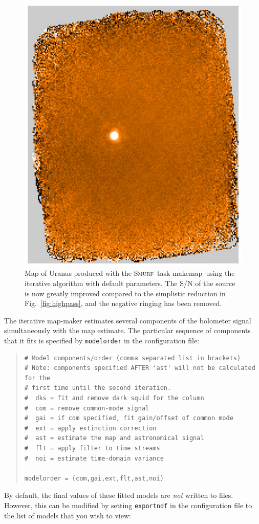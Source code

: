 \documentclass[twoside,11pt]{article}
\newenvironment{myquote}{\begin{quote}\begin{small}}{\end{small}\end{quote}}
\newcommand{\smurf}{\xref{\textsc{Smurf}}{sun258}{}}
\newcommand{\task}[1]{\textsf{#1}}
\newcommand{\makemap}{\xref{\task{makemap}}{sun258}{MAKEMAP}}
\newcommand{\xref}[3]{#1}
\renewcommand{\_}{\texttt{\symbol{95}}}
\begin{document}
\begin{figure}
\begin{center}
\includegraphics[width=0.5\linewidth]{sc19_map_iterate}
\caption{Map of Uranus produced with the \smurf\ task \makemap\ using
  the iterative algorithm with default parameters. The S/N of the
  source is now greatly improved compared to the simplistic reduction
  in Fig.~\ref{fig:highpass}, and the negative ringing has been
  removed.}
\label{fig:itermap}
\end{center}
\end{figure}

The iterative map-maker estimates several components of the bolometer
signal simultaneously with the map estimate. The particular sequence
of components that it fits is specified by \texttt{modelorder} in the
configuration file:

\begin{myquote}
\begin{verbatim}
# Model components/order (comma separated list in brackets)
# Note: components specified AFTER 'ast' will not be calculated for the
# first time until the second iteration.
#  dks = fit and remove dark squid for the column
#  com = remove common-mode signal
#  gai = if com specified, fit gain/offset of common mode
#  ext = apply extinction correction
#  ast = estimate the map and astronomical signal
#  flt = apply filter to time streams
#  noi = estimate time-domain variance

modelorder = (com,gai,ext,flt,ast,noi)
\end{verbatim}
\end{myquote}

By default, the final values of these fitted models are {\em not}
written to files. However, this can be modified by setting
\texttt{exportndf} in the configuration file to the list of models
that you wish to view:
\end{document}
